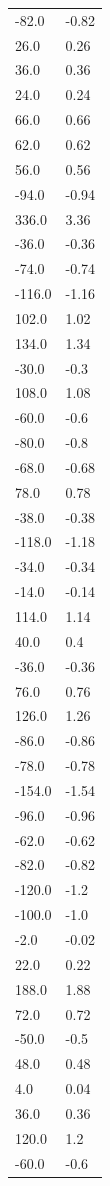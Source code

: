 \begin{longtable}{ll}
-82.0 & -0.82 \\
26.0 & 0.26 \\
36.0 & 0.36 \\
24.0 & 0.24 \\
66.0 & 0.66 \\
62.0 & 0.62 \\
56.0 & 0.56 \\
-94.0 & -0.94 \\
336.0 & 3.36 \\
-36.0 & -0.36 \\
-74.0 & -0.74 \\
-116.0 & -1.16 \\
102.0 & 1.02 \\
134.0 & 1.34 \\
-30.0 & -0.3 \\
108.0 & 1.08 \\
-60.0 & -0.6 \\
-80.0 & -0.8 \\
-68.0 & -0.68 \\
78.0 & 0.78 \\
-38.0 & -0.38 \\
-118.0 & -1.18 \\
-34.0 & -0.34 \\
-14.0 & -0.14 \\
114.0 & 1.14 \\
40.0 & 0.4 \\
-36.0 & -0.36 \\
76.0 & 0.76 \\
126.0 & 1.26 \\
-86.0 & -0.86 \\
-78.0 & -0.78 \\
-154.0 & -1.54 \\
-96.0 & -0.96 \\
-62.0 & -0.62 \\
-82.0 & -0.82 \\
-120.0 & -1.2 \\
-100.0 & -1.0 \\
-2.0 & -0.02 \\
22.0 & 0.22 \\
188.0 & 1.88 \\
72.0 & 0.72 \\
-50.0 & -0.5 \\
48.0 & 0.48 \\
4.0 & 0.04 \\
36.0 & 0.36 \\
120.0 & 1.2 \\
-60.0 & -0.6 \\

\end{longtable}
